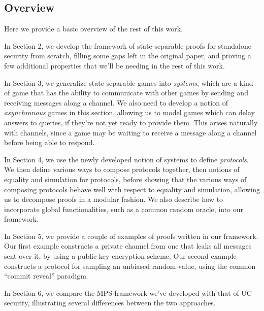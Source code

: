 \subsection{Overview}

Here we provide a basic overview of the rest of this work.

In Section 2, we develop the framework of state-separable proofs
for standalone security from scratch, filling some gaps
left in the original paper, and proving a few additional properties
that we'll be needing in the rest of this work.

In Section 3, we generalize state-separable games into \emph{systems},
which are a kind of game that has the ability to communicate
with other games by sending and receiving messages along a channel.
We also need to develop a notion of \emph{asynchronous} games
in this section, allowing us to model games which can delay
answers to queries, if they're not yet ready to provide them.
This arises naturally with channels, since a game may be waiting
to receive a message along a channel before being able to respond.

In Section 4, we use the newly developed notion of systems
to define \emph{protocols}.
We then define various ways to compose protocols together,
then notions of equality and simulation for protocols,
before showing that the various ways of composing protocols
behave well with respect to equality and simulation,
allowing us to decompose proofs in a modular fashion.
We also describe how to incorporate global functionalities,
such as a common random oracle, into our framework.

In Section 5, we provide a couple of examples of proofs written
in our framework.
Our first example constructs a private channel from one
that leaks all messages sent over it, by using a public key encryption scheme.
Our second example constructs a protocol for sampling
an unbiased random value, using the common ``commit reveal'' paradigm.


In Section 6, we compare the MPS framework we've developed with
that of UC security, illustrating several differences
between the two approaches.
